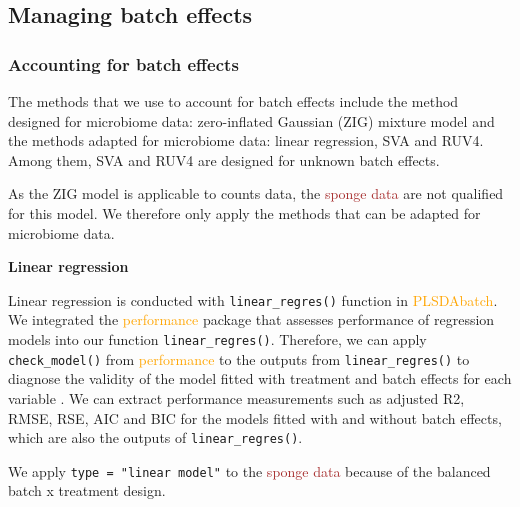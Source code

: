 \documentclass[
]{book}
\begin{document}
\hypertarget{managing-batch-effects-1}{%
\subsection{Managing batch effects}\label{managing-batch-effects-1}}

\hypertarget{accounting-for-batch-effects}{%
\subsubsection{Accounting for batch effects}\label{accounting-for-batch-effects}}

The methods that we use to account for batch effects include the method designed for microbiome data: zero-inflated Gaussian (ZIG) mixture model and the methods adapted for microbiome data: linear regression, SVA and RUV4. Among them, SVA and RUV4 are designed for unknown batch effects.

As the ZIG model is applicable to counts data, the \textcolor{brown}{sponge data} are not qualified for this model. We therefore only apply the methods that can be adapted for microbiome data.

\textbf{Linear regression}

Linear regression is conducted with \texttt{linear\_regres()} function in \textcolor{orange}{PLSDAbatch}. We integrated the \textcolor{orange}{performance} package that assesses performance of regression models into our function \texttt{linear\_regres()}. Therefore, we can apply \texttt{check\_model()} from \textcolor{orange}{performance} to the outputs from \texttt{linear\_regres()} to diagnose the validity of the model fitted with treatment and batch effects for each variable \citep{daniel2020performance}. We can extract performance measurements such as adjusted R2, RMSE, RSE, AIC and BIC for the models fitted with and without batch effects, which are also the outputs of \texttt{linear\_regres()}.

We apply \texttt{type\ =\ "linear\ model"} to the \textcolor{brown}{sponge data} because of the balanced batch x treatment design.
\end{document}
